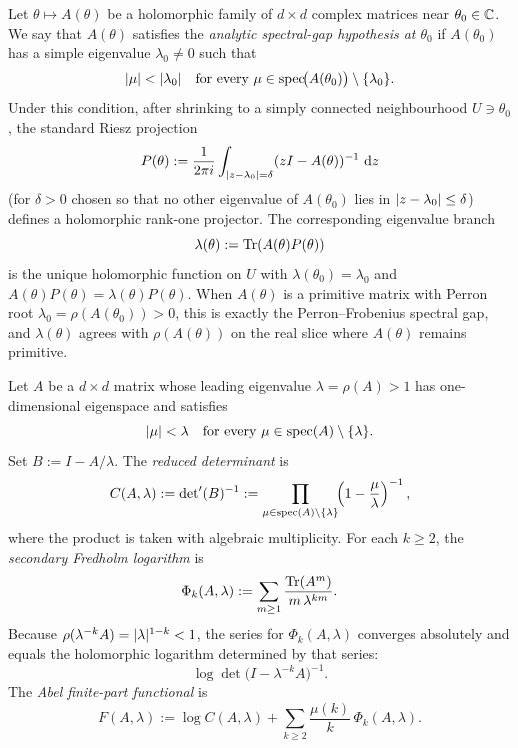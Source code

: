 \begin{definition}
  \label{def:spectral-gap-hypothesis}
  Let \(\theta\mapsto A(\theta)\) be a holomorphic family of
  \(d\times d\) complex matrices near \(\theta_0\in\mathbb{C}\). We say that
  \(A(\theta)\) satisfies the \emph{analytic spectral-gap hypothesis at
  \(\theta_0\)} if \(A(\theta_0)\) has a simple eigenvalue
  \(\lambda_0\ne 0\) such that
  \[
    \lvert \mu \rvert<\lvert \lambda_0 \rvert
    \quad\text{for every }
    \mu\in\operatorname{spec}\!\bigl(A(\theta_0)\bigr)\setminus\{\lambda_0\}.
  \]
  Under this condition, after shrinking to a simply connected
  neighbourhood \(U\ni\theta_0\), the standard Riesz projection
  \[
    P(\theta)
    :=\frac{1}{2\pi i}
      \int_{\lvert z-\lambda_0 \rvert=\delta}
      (zI-A(\theta))^{-1}\,\mathop{}\!\mathrm{d} z
  \]
  (for \(\delta>0\) chosen so that no other eigenvalue of
  \(A(\theta_0)\) lies in \(\lvert z-\lambda_0 \rvert\le\delta\)) defines a
  holomorphic rank-one projector. The corresponding eigenvalue branch
  \[
    \lambda(\theta):=\operatorname{Tr}(A(\theta)P(\theta))
  \]
  is the unique holomorphic function on \(U\) with \(\lambda(\theta_0)
  =\lambda_0\) and \(A(\theta)P(\theta)=\lambda(\theta)P(\theta)\).
  When \(A(\theta)\) is a primitive matrix with Perron root \(\lambda_0
  =\rho(A(\theta_0))>0\), this is exactly the Perron--Frobenius
  spectral gap, and \(\lambda(\theta)\) agrees with \(\rho(A(\theta))\)
  on the real slice where \(A(\theta)\) remains primitive.
\end{definition}

\begin{definition}
  \label{def:algebraic-finite-part}
  Let \(A\) be a \(d\times d\) matrix whose leading eigenvalue
  \(\lambda=\rho(A)>1\) has one-dimensional eigenspace and satisfies
  \[
    \lvert \mu \rvert<\lambda
    \quad\text{for every }
    \mu\in\operatorname{spec}(A)\setminus\{\lambda\}.
  \]
  Set \(B:=I-A/\lambda\). The
  \emph{reduced determinant} is
  \[
    C(A,\lambda)
    :=\det\nolimits'(B)^{-1}
    :=\prod_{\mu\in\operatorname{spec}(A)\setminus\{\lambda\}}
      \!\!\left(1-\frac{\mu}{\lambda}\right)^{-1},
  \]
  where the product is taken with algebraic multiplicity. For each
  \(k\ge 2\), the \emph{secondary Fredholm logarithm} is
  \[
    \Phi_k(A,\lambda)
    :=\sum_{m\ge 1}\frac{\operatorname{Tr}(A^m)}{m\,\lambda^{km}}.
  \]
  Because \(\rho(\lambda^{-k}A)=\lvert \lambda \rvert^{1-k}<1\), the series for
  \(\Phi_k(A,\lambda)\) converges absolutely and equals the holomorphic
  logarithm determined by that series:
  \[
    \log\det\!\bigl(I-\lambda^{-k}A\bigr)^{-1}.
  \]
  The \emph{Abel finite-part functional} is
  \[
    F(A,\lambda)
    :=\log C(A,\lambda)
      +\sum_{k\ge 2}\frac{\mu(k)}{k}\,\Phi_k(A,\lambda).
  \]
\end{definition}

